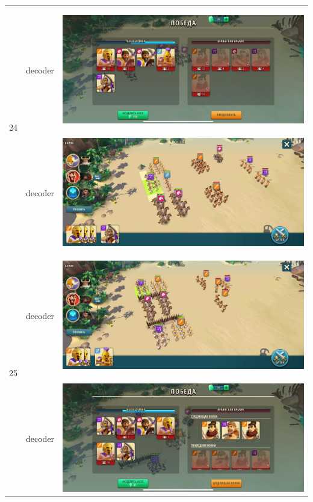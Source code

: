 \begin{longtable}{|c|c|c|}
    \hline
    \multirow{2}{*}{24} & decoder &
    \hypertarget{fight24}{\includegraphics[width=0.75\linewidth]{./parts/media/TreasureHunt/24/decoder/photo_2022-04-06_18-10-13.jpg}} \\
    & decoder &
    \includegraphics[width=0.75\linewidth]{./parts/media/TreasureHunt/24/decoder/photo_2022-04-06_18-10-02.jpg} \\
    \hline
    \multirow{10}{*}{25} & decoder &
    \hypertarget{fight25}{\includegraphics[width=0.75\linewidth]{./parts/media/TreasureHunt/25/decoder/photo_2022-04-06_18-10-20.jpg}} \\
    & decoder &
    \includegraphics[width=0.75\linewidth]{./parts/media/TreasureHunt/25/decoder/photo_2022-04-06_18-10-30.jpg} \\

\end{longtable}
